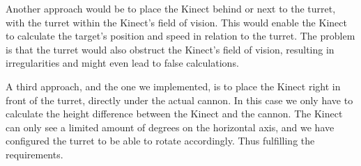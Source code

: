 Another approach would be to place the Kinect behind or next to the turret, with the turret within the Kinect's field of vision. This would enable the Kinect to calculate the target's position and speed in relation to the turret. The problem is that the turret would also obstruct the Kinect's field of vision, resulting in irregularities and might even lead to false calculations.

A third approach, and the one we implemented, is to place the Kinect right in front of the turret, directly under the actual cannon. In this case we only have to calculate the height difference between the Kinect and the cannon. The Kinect can only see a limited amount of degrees on the horizontal axis, and we have configured the turret to be able to rotate accordingly. Thus fulfilling the requirements.
